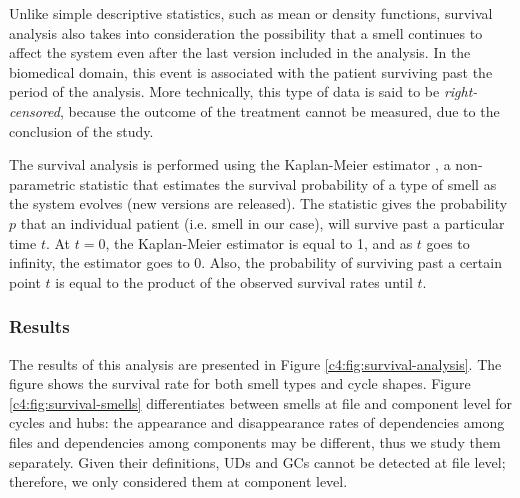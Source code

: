 Unlike simple descriptive statistics, such as mean or density functions, survival analysis also takes into consideration the possibility that a smell continues to affect the system even after the last version included in the analysis.
In the biomedical domain, this event is associated with the patient surviving past the period of the analysis.
More technically, this type of data is said to be \emph{right-censored}, because the outcome of the treatment cannot be measured, due to the conclusion of the study.

The survival analysis is performed using the Kaplan-Meier estimator \cite{Kaplan1958}, a non-parametric statistic that estimates the survival probability of a type of smell as the system evolves (new versions are released).
The statistic gives the probability $p$ that an individual patient (i.e. smell in our case), will survive past a particular time $t$.
At $t = 0$, the Kaplan-Meier estimator is equal to 1, and as $t$ goes to infinity, the estimator goes to 0. Also, the probability of surviving past a certain point $t$ is equal to the product of the observed survival rates until $t$.

\subsubsection{Results}
The results of this analysis are presented in Figure \ref{c4:fig:survival-analysis}. The figure shows the survival rate for both smell types and cycle shapes.
Figure \ref{c4:fig:survival-smells} differentiates between smells at file and component level for cycles and hubs: the appearance and disappearance rates of dependencies among files and dependencies among components may be different, thus we study them separately.
Given their definitions, UDs and GCs cannot be detected at file level; therefore, we only considered them at component level.

